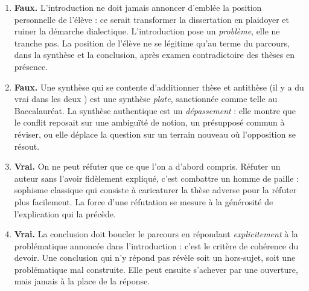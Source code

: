 \documentclass[11pt]{article}
\begin{document}
\begin{corrige}
\begin{enumerate}
\item \textbf{Faux.} L'introduction ne doit jamais annoncer d'emblée la position personnelle de l'élève : ce serait transformer la dissertation en plaidoyer et ruiner la démarche dialectique. L'introduction pose un \emph{problème}, elle ne tranche pas. La position de l'élève ne se légitime qu'au terme du parcours, dans la synthèse et la conclusion, après examen contradictoire des thèses en présence.
\item \textbf{Faux.} Une synthèse qui se contente d'additionner thèse et antithèse (\guillemotleft il y a du vrai dans les deux \guillemotright) est une synthèse \emph{plate}, sanctionnée comme telle au Baccalauréat. La synthèse authentique est un \emph{dépassement} : elle montre que le conflit reposait sur une ambiguïté de notion, un présupposé commun à réviser, ou elle déplace la question sur un terrain nouveau où l'opposition se résout.
\item \textbf{Vrai.} On ne peut réfuter que ce que l'on a d'abord compris. Réfuter un auteur sans l'avoir fidèlement expliqué, c'est combattre un homme de paille : sophisme classique qui consiste à caricaturer la thèse adverse pour la réfuter plus facilement. La force d'une réfutation se mesure à la générosité de l'explication qui la précède.
\item \textbf{Vrai.} La conclusion doit boucler le parcours en répondant \emph{explicitement} à la problématique annoncée dans l'introduction : c'est le critère de cohérence du devoir. Une conclusion qui n'y répond pas révèle soit un hors-sujet, soit une problématique mal construite. Elle peut ensuite s'achever par une ouverture, mais jamais à la place de la réponse.
\end{enumerate}
\end{corrige}
\end{document}

